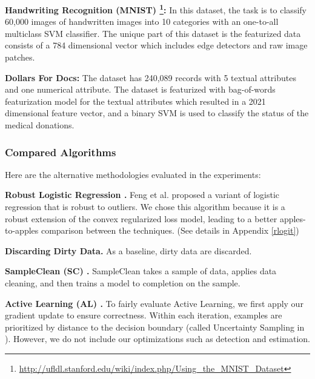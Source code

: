 \vspace{0.25em}

\noindent\textbf{Handwriting Recognition (MNIST) \footnote{\scriptsize\url{http://ufldl.stanford.edu/wiki/index.php/Using_the_MNIST_Dataset}}: } In this dataset, the task is to classify 60,000 images of handwritten images into 10 categories with an one-to-all multiclass SVM classifier. The unique part of this dataset is the featurized data consists of a 784 dimensional vector which includes edge detectors and raw image patches. 

\vspace{0.25em}

\noindent\textbf{Dollars For Docs: } The dataset has 240,089 records with 5 textual attributes and one numerical attribute.
The dataset is featurized with bag-of-words featurization model for the textual attributes which resulted in a 2021 dimensional feature vector, and a binary SVM is used to classify the status of the medical donations.

\subsubsection{Compared Algorithms}
\noindent Here are the alternative methodologies evaluated in the experiments:

\vspace{0.25em}

\noindent\textbf{Robust Logistic Regression \cite{feng2014robust}. } Feng et al. proposed a variant of logistic regression that is robust to outliers. We chose this algorithm because it is a robust extension of the convex regularized loss model, leading to a better apples-to-apples comparison between the techniques. (See details in Appendix \ref{rlogit})  

\vspace{0.25em}

\noindent\textbf{Discarding Dirty Data. } As a baseline, dirty data are discarded.

\vspace{0.25em}

\noindent\textbf{SampleClean (SC) \cite{wang1999sample}. } SampleClean takes a sample of data, applies data cleaning, and then trains a model to completion on the sample.

\vspace{0.25em}

\noindent\textbf{Active Learning (AL) \cite{guillory2009active}. } To fairly evaluate Active Learning, we first apply our gradient update to ensure correctness.
Within each iteration, examples are prioritized by distance to the decision boundary (called Uncertainty Sampling in \cite{settles2010active}).
However, we do not include our optimizations such as detection and estimation.


